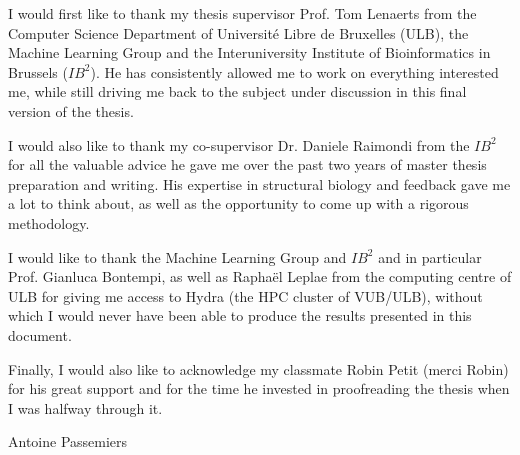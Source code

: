 
\noindent I would first like to thank my thesis supervisor Prof. Tom Lenaerts from
the Computer Science Department of Université Libre de Bruxelles (ULB),
the Machine Learning Group and the Interuniversity Institute of
Bioinformatics in Brussels ($IB^2$).
He has consistently allowed me to work on everything interested me,
while still driving me back to the subject under discussion in this final
version of the thesis.

\vspace{0.5cm}

\noindent I would also like to thank my co-supervisor Dr. Daniele Raimondi from
the $IB^2$ for all the valuable advice he gave me over the past two years
of master thesis preparation and writing. His expertise in structural
biology and feedback gave me a lot to think about, as well as the opportunity
to come up with a rigorous methodology.

\vspace{0.5cm}

\noindent I would like to thank the Machine Learning Group and $IB^2$ and in particular
Prof. Gianluca Bontempi, as well as Raphaël Leplae from the computing centre
of ULB for giving me access to Hydra (the HPC cluster of VUB/ULB), without
which I would never have been able to produce the results presented in this
document.

\vspace{0.5cm}

\noindent Finally, I would also like to acknowledge my classmate Robin Petit (merci Robin)
for his great support and for the time he invested in proofreading
the thesis when I was halfway through it.

\vspace{1cm}

Antoine Passemiers
